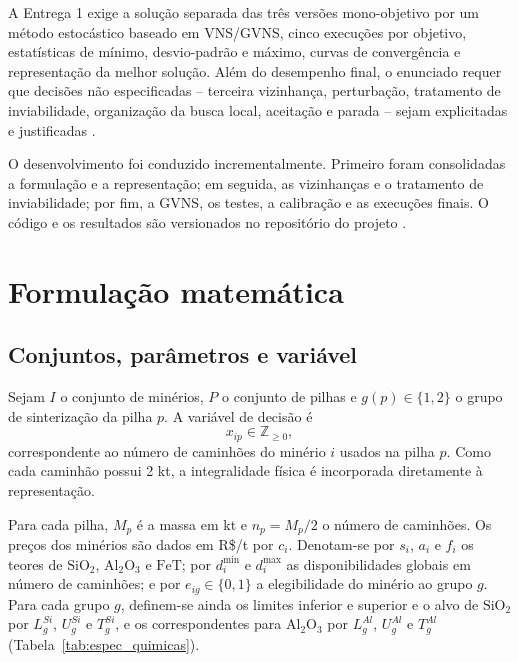 \documentclass[10pt,twocolumn,a4paper]{article}
\begin{document}
A Entrega 1 exige a solução separada das três versões mono-objetivo por um método estocástico baseado em VNS/GVNS, cinco execuções por objetivo, estatísticas de mínimo, desvio-padrão e máximo, curvas de convergência e representação da melhor solução. Além do desempenho final, o enunciado requer que decisões não especificadas -- terceira vizinhança, perturbação, tratamento de inviabilidade, organização da busca local, aceitação e parada -- sejam explicitadas e justificadas \cite{case_enunciado}.

O desenvolvimento foi conduzido incrementalmente. Primeiro foram consolidadas a formulação e a representação; em seguida, as vizinhanças e o tratamento de inviabilidade; por fim, a GVNS, os testes, a calibração e as execuções finais. O código e os resultados são versionados no repositório do projeto \cite{repo_projeto}.

\section{Formulação matemática}

\subsection{Conjuntos, parâmetros e variável}

Sejam $I$ o conjunto de minérios, $P$ o conjunto de pilhas e $g(p) \in \{1, 2\}$ o grupo de sinterização da pilha $p$. A variável de decisão é
\begin{equation}
x_{ip} \in \mathbb{Z}_{\ge 0},
\end{equation}
correspondente ao número de caminhões do minério $i$ usados na pilha $p$. Como cada caminhão possui 2 kt, a integralidade física é incorporada diretamente à representação.

Para cada pilha, $M_p$ é a massa em kt e $n_p = M_p/2$ o número de caminhões. Os preços dos minérios são dados em R\$/t por $c_i$. Denotam-se por $s_i$, $a_i$ e $f_i$ os teores de $\text{SiO}_2$, $\text{Al}_2\text{O}_3$ e $\text{FeT}$; por $d_i^{\min}$ e $d_i^{\max}$ as disponibilidades globais em número de caminhões; e por $e_{ig} \in \{0, 1\}$ a elegibilidade do minério ao grupo $g$. Para cada grupo $g$, definem-se ainda os limites inferior e superior e o alvo de $\text{SiO}_2$ por $L_g^{Si}$, $U_g^{Si}$ e $T_g^{Si}$, e os correspondentes para $\text{Al}_2\text{O}_3$ por $L_g^{Al}$, $U_g^{Al}$ e $T_g^{Al}$ (Tabela~\ref{tab:espec_quimicas}).
\end{document}
